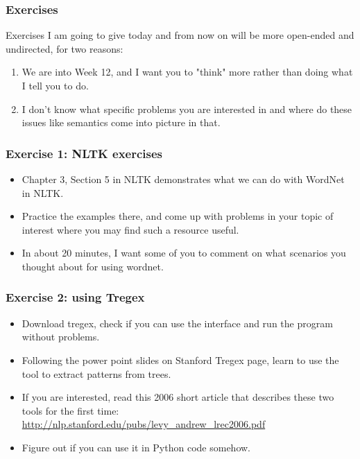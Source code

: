 \documentclass{beamer}
\begin{document}
\begin{frame}
\frametitle{Exercises}
Exercises I am going to give today and from now on will be more open-ended and undirected, for two reasons: 
\begin{enumerate}
\item We are into Week 12, and I want you to "think" more rather than doing what I tell you to do. 
\item I don't know what specific problems you are interested in and where do these issues like semantics come into picture in that.
\end{enumerate}
\end{frame}

\begin{frame}
\frametitle{Exercise 1: NLTK exercises}
\begin{itemize}
\item Chapter 3, Section 5 in NLTK demonstrates what we can do with WordNet in NLTK.
\item Practice the examples there, and come up with problems in your topic of interest where you may find such a resource useful.
\item In about 20 minutes, I want some of you to comment on what scenarios you thought about for using wordnet.
\end{itemize}
\end{frame}

\begin{frame}
\frametitle{Exercise 2: using Tregex}
\begin{itemize}
\item Download tregex, check if you can use the interface and run the program without problems.
\item Following the power point slides on Stanford Tregex page, learn to use the tool to extract patterns from trees.
\item If you are interested, read this 2006 short article that describes these two tools for the first time: \url{http://nlp.stanford.edu/pubs/levy_andrew_lrec2006.pdf}
\item Figure out if you can use it in Python code somehow.
\end{itemize}
\end{frame}
\end{document}
